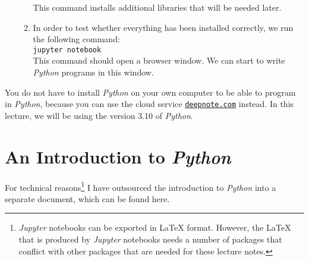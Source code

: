 \begin{enumerate}[(a)]
\begin{enumerate}
            This command installs additional libraries that will be needed later.
      \item In order to test whether everything has been installed correctly, we run the following command:
            \\[0.2cm]
            \hspace*{1.3cm}
            \texttt{jupyter notebook}
            \\[0.2cm]
            This command should open a browser window.  We can start to write \textsl{Python} programs in this window.
      \end{enumerate}
\end{enumerate}
You do not have to install \textsl{Python} on your own computer to be able to program in \textsl{Python},
because you can use the cloud service \href{https://deepnote.com}{\texttt{deepnote.com}} instead.  
In this lecture, we will be using the version 3.10 of \textsl{Python}.

\section{An Introduction to \textsl{Python}}
For technical reasons\footnote{\textsl{Jupyter} notebooks can be exported in {\LaTeX} format.  However, the 
{\LaTeX} that is produced by \textsl{Jupyter} notebooks needs a number of packages that conflict with other
packages that are needed for these lecture notes.}
I have outsourced the introduction to \textsl{Python} into a separate document, which can be found
here.


